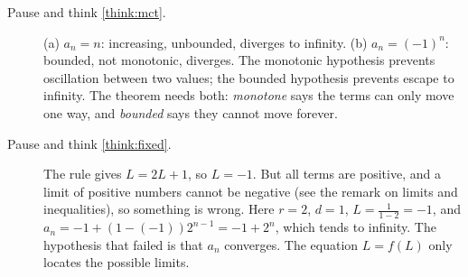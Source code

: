 \documentclass[11pt]{article}
\begin{document}
\begin{description}
  \item[Pause and think \ref{think:mct}.] (a) $a_n=n$: increasing, unbounded, diverges to infinity. (b) $a_n=(-1)^n$: bounded, not monotonic, diverges. The monotonic hypothesis prevents oscillation between two values; the bounded hypothesis prevents escape to infinity. The theorem needs both: \emph{monotone} says the terms can only move one way, and \emph{bounded} says they cannot move forever.
  \item[Pause and think \ref{think:fixed}.] The rule gives $L=2L+1$, so $L=-1$. But all terms are positive, and a limit of positive numbers cannot be negative (see the remark on limits and inequalities), so something is wrong. Here $r=2$, $d=1$, $L=\frac1{1-2}=-1$, and $a_n=-1+(1-(-1))2^{n-1}=-1+2^n$, which tends to infinity. The hypothesis that failed is that $a_n$ converges. The equation $L=f(L)$ only locates the possible limits.
\end{description}
\end{document}
